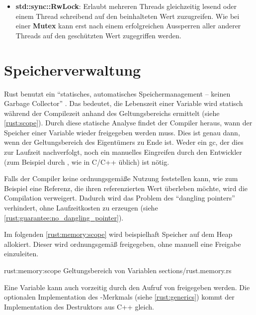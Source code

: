 \begin{itemize}
	\item \textbf{std::sync::RwLock}: Erlaubt mehreren Threads gleichzeitig lesend oder einem Thread schreibend auf den beinhalteten Wert zuzugreifen. Wie bei einer \textbf{Mutex} kann erst nach einem erfolgreichen Aussperren aller anderer Threads auf den geschützten Wert zugegriffen werden.
	
	
\end{itemize}


\section{Speicherverwaltung}
\label{rust:scope}
\label{rust:static_analysis}

Rust benutzt ein \enquote{statisches, automatisches Speichermanagement -- keinen Garbage Collector} \cite{rust:youtube:goto2017}.
Das bedeutet, die Lebenszeit einer Variable wird statisch während der Compilezeit anhand des Geltungsbereichs ermittelt (siehe \autoref{rust:scope}).
Durch diese statische Analyse findet der Compiler heraus, wann der Speicher einer Variable wieder freigegeben werden muss.
Dies ist genau dann, wenn der Geltungsbereich des Eigentümers zu Ende ist.
Weder ein \gls{gc}, der dies zur Laufzeit nachverfolgt, noch ein manuelles Eingreifen durch den Entwickler (zum Beispiel durch , wie in C/C++ üblich) ist nötig.

Falls der Compiler keine ordnungsgemäße Nutzung feststellen kann, wie zum Beispiel eine Referenz, die ihren referenzierten Wert überleben möchte, wird die Compilation verweigert.
Dadurch wird das Problem des \enquote{dangling pointers} verhindert, ohne Laufzeitkosten zu erzeugen (siehe \autoref{rust:guarantee:no_dangling_pointer}).

Im folgenden \autoref{rust:memory:scope} wird beispielhaft Speicher auf dem Heap allokiert.
Dieser wird ordnungsgemäß freigegeben, ohne manuell eine Freigabe einzuleiten.

\rustcinclude
	{rust:memory:scope}
	{Geltungsbereich von Variablen}
	{sections/rust.memory.rs}

Eine Variable kann auch vorzeitig durch den Aufruf von  freigegeben werden.
Die optionalen Implementation des -Merkmals (siehe \autoref{rust:generics}) kommt der Implementation des Destruktors aus C++ gleich.

